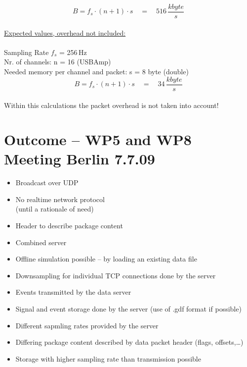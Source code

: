 \documentclass[11pt]{scrartcl}
\begin{document}
  \begin{displaymath}
    B = f_s \cdot (n + 1) \cdot s \quad = \quad 516\, \frac{kbyte}{s}
  \end{displaymath}
  \\

  \underline{Expected values, overhead not included:}\\
  \\
  Sampling Rate $f_s$ = 256\,Hz\\
  Nr. of channels: n = 16 (USBAmp)\\
  Needed memory per channel and packet: s = 8 byte (double)\\

  \begin{displaymath}
    B = f_s \cdot (n + 1) \cdot s \quad = \quad 34\, \frac{kbyte}{s}
  \end{displaymath}
  \\
  Within this calculations the packet overhead is not taken into account!

\section{Outcome -- WP5 and WP8 Meeting Berlin 7.7.09}
  \begin{itemize}
    \item Broadcast over UDP
    \item No realtime network protocol\\
      \hspace*{0.2cm} (until a rationale of need)
    \item Header to describe package content
    \item Combined server
    \item Offline simulation possible -- by loading an existing data file
    \item Downsampling for individual TCP connections done by the server
    \item Events transmitted by the data server
    \item Signal and event storage done by the server (use of .gdf format if possible)
    \item Different sapmling rates provided by the server
    \newline
    \item Differing package content described by data packet header (flags, offsets,\dots)
    \item Storage with higher sampling rate than transmission possible
  \end{itemize}
\end{document}
